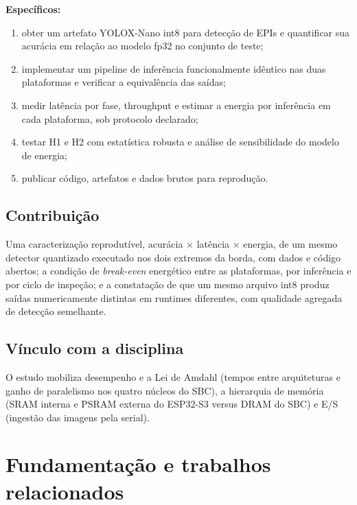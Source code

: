 \documentclass[11pt,a4paper]{article}
\begin{document}
\noindent\textbf{Específicos:}
\begin{enumerate}
\item obter um artefato YOLOX-Nano int8 para detecção de EPIs e quantificar sua acurácia em relação ao
modelo fp32 no conjunto de teste;
\item implementar um pipeline de inferência funcionalmente idêntico nas duas plataformas e verificar a
equivalência das saídas;
\item medir latência por fase, throughput e estimar a energia por inferência em cada plataforma, sob
protocolo declarado;
\item testar H1 e H2 com estatística robusta e análise de sensibilidade do modelo de energia;
\item publicar código, artefatos e dados brutos para reprodução.
\end{enumerate}

\subsection{Contribuição}
Uma caracterização reprodutível, acurácia $\times$ latência $\times$ energia, de um mesmo detector quantizado
executado nos dois extremos da borda, com dados e código abertos; a condição de \emph{break-even} energético
entre as plataformas, por inferência e por ciclo de inspeção; e a constatação de que um mesmo arquivo int8
produz saídas numericamente distintas em runtimes diferentes, com qualidade agregada de detecção semelhante.

\subsection{Vínculo com a disciplina}
O estudo mobiliza desempenho e a Lei de Amdahl \cite{amdahl1967validity} (tempos entre arquiteturas e ganho de
paralelismo nos quatro núcleos do SBC), a hierarquia de memória (SRAM interna e PSRAM externa do ESP32-S3 versus
DRAM do SBC) e E/S (ingestão das imagens pela serial).

\section{Fundamentação e trabalhos relacionados}
\end{document}

